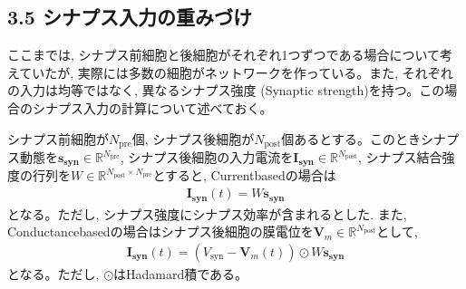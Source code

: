 \documentclass[letterpaper,10pt,english]{sphinxmanual}
\begin{document}
\subsection{3.5 シナプス入力の重みづけ}
\label{\detokenize{3-6_synaptic-weighted:id1}}\label{\detokenize{3-6_synaptic-weighted::doc}}
ここまでは, シナプス前細胞と後細胞がそれぞれ1つずつである場合について考えていたが, 実際には多数の細胞がネットワークを作っている。また, それぞれの入力は均等ではなく, 異なるシナプス強度 (Synaptic strength)を持つ。この場合のシナプス入力の計算について述べておく。

シナプス前細胞が\(N_{\text{pre}}\)個, シナプス後細胞が\(N_{\text{post}}\)個あるとする。このときシナプス動態を\(\boldsymbol{s_{\text{syn}}}\in \mathbb{R}^{N_{\text{pre}}}\), シナプス後細胞の入力電流を\(\boldsymbol{I_{\text{syn}}}\in \mathbb{R}^{N_{\text{post}}}\), シナプス結合強度の行列を\(W\in \mathbb{R}^{N_{\text{post}} \times N_{\text{pre}}}\)とすると, Current\sphinxhyphen{}basedの場合は
\begin{equation*}
\begin{split}
\begin{equation}
\boldsymbol{I_{\text{syn}}}(t)=W \boldsymbol{s_{\text{syn}}}  
\end{equation}
\end{split}
\end{equation*}
となる。ただし, シナプス強度にシナプス効率が含まれるとした. また, Conductance\sphinxhyphen{}basedの場合はシナプス後細胞の膜電位を\(\boldsymbol{V}_{m}\in \mathbb{R}^{N_{\text{post}}}\)として,
\begin{equation*}
\begin{split}
\begin{equation}
\boldsymbol{I_{\text{syn}}}(t)=\left(V_{\text{syn}}-\boldsymbol{V}_{m}(t)\right)\odot W \boldsymbol{s_{\text{syn}}}
\end{equation}
\end{split}
\end{equation*}
となる。ただし, \(\odot\)はHadamard積である。
\end{document}
